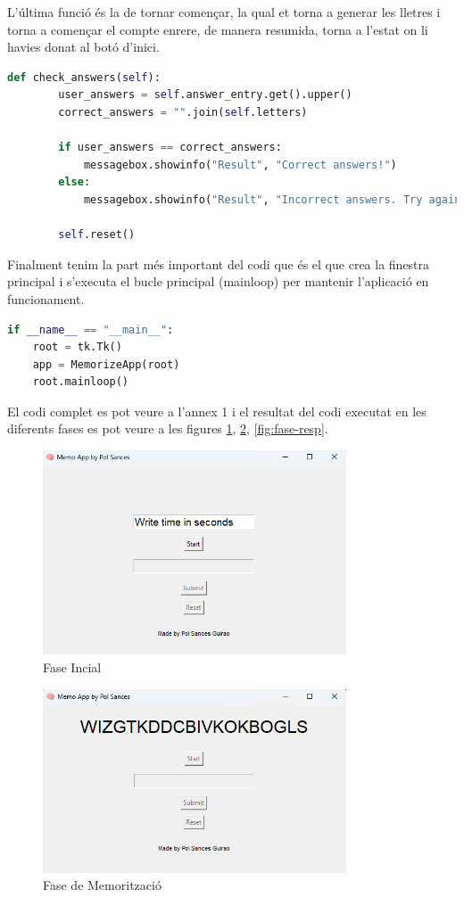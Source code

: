 L'última funció és la de tornar començar, la qual et torna a generar les lletres i torna a començar el compte enrere, de manera resumida, torna a l'estat on li havies donat al botó d'inici.

\begin{lstlisting}[language=Python, style=colorEX, caption=Funció per tornar a començar]
    def check_answers(self):
        user_answers = self.answer_entry.get().upper()
        correct_answers = "".join(self.letters)

        if user_answers == correct_answers:
            messagebox.showinfo("Result", "Correct answers!")
        else:
            messagebox.showinfo("Result", "Incorrect answers. Try again.")

        self.reset()
\end{lstlisting}

Finalment tenim la part més important del codi que és el que crea la finestra principal i s'executa el bucle principal (mainloop)  per mantenir l'aplicació en funcionament.

\begin{lstlisting}[language=Python, style=colorEX, caption=Bucle per mantenir l'aplicació en funcionament]
if __name__ == "__main__":
    root = tk.Tk()
    app = MemorizeApp(root)
    root.mainloop()
\end{lstlisting}

El codi complet es pot veure a l'annex 1 i el resultat del codi executat en les diferents fases es pot veure a les figures \ref{fig:fase-incial}, \ref{fig:fase-memo}, \ref{fig:fase-resp}.

\begin{figure}[h!]
    \centering
    \includegraphics[width=9cm]{img/figures/app-fase1.png}
    \caption{Fase Incial}
    \label{fig:fase-incial}
\end{figure}

\begin{figure}[h!]
    \centering
    \includegraphics[width=9cm]{img/figures/app-fase2.png}
    \caption{Fase de Memorització}
    \label{fig:fase-memo}
\end{figure}

